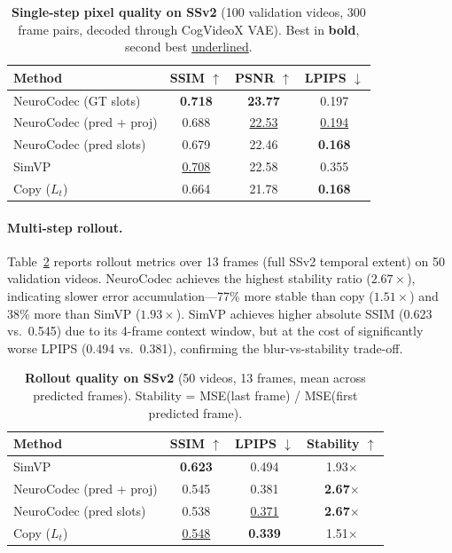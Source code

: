 \documentclass{article}
\newcommand{\method}{NeuroCodec}
\begin{document}
\begin{table}[t]
\centering
\caption{%
  \textbf{Single-step pixel quality on SSv2} (100 validation videos,
  300 frame pairs, decoded through CogVideoX VAE).
  Best in \textbf{bold}, second best \underline{underlined}.
}
\label{tab:ssv2_single}
\begin{tabular}{@{}lccc@{}}
\toprule
Method & SSIM $\uparrow$ & PSNR $\uparrow$ & LPIPS $\downarrow$ \\
\midrule
\method{} (GT slots)
  & \textbf{0.718}
  & \textbf{23.77}
  & 0.197 \\
\method{} (pred + proj)
  & 0.688
  & \underline{22.53}
  & \underline{0.194} \\
\method{} (pred slots)
  & 0.679
  & 22.46
  & \textbf{0.168} \\
SimVP~\cite{gao2022simvp}
  & \underline{0.708}
  & 22.58
  & 0.355 \\
Copy ($L_t$)
  & 0.664
  & 21.78
  & \textbf{0.168} \\
\bottomrule
\end{tabular}
\end{table}

\paragraph{Multi-step rollout.}
Table~\ref{tab:ssv2_rollout} reports rollout metrics over 13 frames
(full SSv2 temporal extent) on 50 validation videos.
\method{} achieves the highest stability ratio ($2.67\times$),
indicating slower error accumulation---77\% more stable than
copy ($1.51\times$) and 38\% more than SimVP ($1.93\times$).
SimVP achieves higher absolute SSIM (0.623 vs.\ 0.545) due to its
4-frame context window, but at the cost of significantly worse LPIPS
(0.494 vs.\ 0.381), confirming the blur-vs-stability trade-off.

\begin{table}[t]
\centering
\caption{%
  \textbf{Rollout quality on SSv2} (50 videos, 13 frames, mean across
  predicted frames).
  Stability = MSE(last frame) / MSE(first predicted frame).
}
\label{tab:ssv2_rollout}
\begin{tabular}{@{}lccc@{}}
\toprule
Method & SSIM $\uparrow$ & LPIPS $\downarrow$ & Stability $\uparrow$ \\
\midrule
SimVP~\cite{gao2022simvp}
  & \textbf{0.623}
  & 0.494
  & 1.93$\times$ \\
\method{} (pred + proj)
  & 0.545
  & 0.381
  & \textbf{2.67}$\times$ \\
\method{} (pred slots)
  & 0.538
  & \underline{0.371}
  & \textbf{2.67}$\times$ \\
Copy ($L_t$)
  & \underline{0.548}
  & \textbf{0.339}
  & 1.51$\times$ \\
\bottomrule
\end{tabular}
\end{table}
\end{document}
